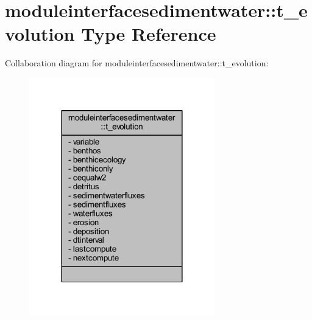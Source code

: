 \hypertarget{structmoduleinterfacesedimentwater_1_1t__evolution}{}\section{moduleinterfacesedimentwater\+:\+:t\+\_\+evolution Type Reference}
\label{structmoduleinterfacesedimentwater_1_1t__evolution}


Collaboration diagram for moduleinterfacesedimentwater\+:\+:t\+\_\+evolution\+:\nopagebreak
\begin{figure}[H]
\begin{center}
\leavevmode
\includegraphics[width=228pt]{structmoduleinterfacesedimentwater_1_1t__evolution__coll__graph}
\end{center}
\end{figure}
